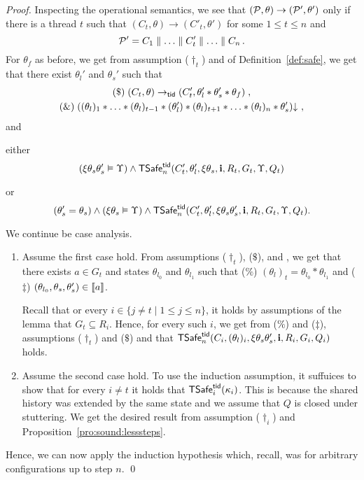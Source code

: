 \begin{proof}
Inspecting the operational semantics, we see that $(\mathcal{P},\theta)\rightarrow (\mathcal{P}',\theta')$
only if there is a thread $t$ such that $(C_t,\theta)\rightarrow (C'_t,\theta')$
for some $1 \leq t \leq n$ and 
$$
\mathcal{P}'= C_1 \parallel \ldots   \parallel C'_t \parallel  \ldots \parallel   C_n\,.
$$
For $\theta_f$ as before, we get from 
assumption ($\dag_t$) and  of Definition~\ref{def:safe}, we get that 
there exist $\theta_l'$ and $\theta_s'$ such that 
\begin{gather*}
(\$)\;
(C_t,\theta)\rightarrow_{{\sf tid}} (C_t',\theta_l'*\theta_s'*\theta_f)\; ,
\\
(\&)\;
((\theta_l)_1 * \ldots * (\theta_l)_{t-1} * (\theta_l') * (\theta_l)_{t+1} * \ldots * (\theta_l)_n * \theta_s')\mathpunct{\downarrow}\,,
\end{gather*}
and 
\begin{compactenum}
\item either  \label{proof:sound:prog:step}
$$
(\xi\theta_s\theta_s'\vDash \Upsilon) \land
{\sf TSafe}^{{\sf tid}}_n(C_t',\theta_l',\xi\theta_s,{\bf i},R_t,G_t,\Upsilon,Q_t)
$$
\item  or \label{proof:sound:prog:stutter}
$$
(\theta'_s=\theta_s) \land (\xi\theta_s\vDash \Upsilon) 
\land 
{\sf TSafe}^{{\sf tid}}_n(C_t',\theta_l',\xi\theta_s\theta_s',{\bf i},R_t,G_t,\Upsilon,Q_t).
$$

\end{compactenum} 

We continue be case analysis.
\begin{enumerate}
\item
Assume the first case hold.
From assumptions ($\dag_t$), ($\$$),  and , we get that there exists $a \in G_t$ 
and states $\theta_{l_0}$ and $\theta_{l_1}$ 
such that 
($\%$) $(\theta_l)_t = \theta_{l_0} * \theta_{l_1}$ and 
($\ddag$) $(\theta_{l_0} , \theta_s, \theta_s') \in \llbracket a \rrbracket$.

Recall that or every $i\in\{j \neq t \mid 1 \leq j \leq n\}$, 
it holds by assumptions of the lemma that $G_t \subseteq R_i$.
Hence, for every  such $i$, we get from ($\%$) and ($\ddag$), 
assumptions ($\dag_t$) and ($\$$)  and  that 
${\sf TSafe}^{{\sf tid}}_n(C_i,(\theta_l)_i,\xi\theta_s\theta_s',{\bf i},R_i,G_i,Q_i)$ holds.

\item
Assume the second case hold.
To use the induction assumption, it  suffuices to show that for every $i\neq t$
it holds that ${\sf TSafe}^{{\sf tid}}_i(\kappa_i)$. This is because the shared history was extended by the same state and we assume that
$Q$ is closed under stuttering.
We get the desired result from assumption ($\dag_i$) and Proposition~\ref{pro:sound:lesssteps}.
\end{enumerate}

Hence, we can now apply the induction hypothesis which, recall, was for arbitrary configurations up to step $n$.
\qed
\end{proof}

